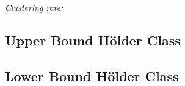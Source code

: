 \documentclass[11pt]{article}
\begin{document}
\textit{Clustering rate:}


\subsection{Upper Bound H\"older Class} \label{sec:upper_hold}

\subsection{Lower Bound H\"older Class} \label{sec:lower_hold}



\end{document}
